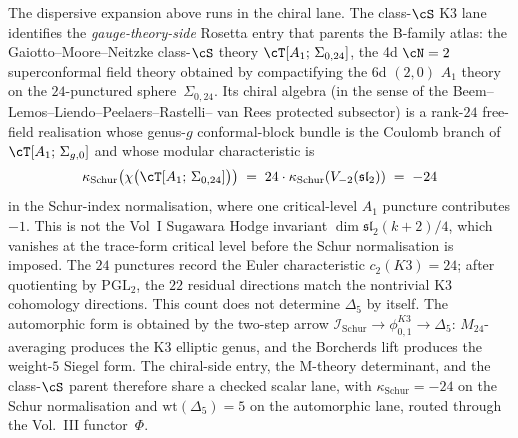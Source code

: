 \begin{remark}[class-$\cS$ $A_1$ on $\Sigma_{0,24}$ as the 4d $\cN=2$ parent]
\label{rem:rosetta-classS-sigma-0-24}
%
%
%
The dispersive expansion above runs in the chiral lane. The class-$\cS$
K3 lane
identifies the \emph{gauge-theory-side} Rosetta entry that parents
the B-family atlas: the Gaiotto--Moore--Neitzke class-$\cS$ theory
$\cT[A_1;\,\Sigma_{0,24}]$, the 4d $\cN=2$ superconformal field
theory obtained by compactifying the 6d $(2,0)$ $A_1$ theory on the
$24$-punctured sphere~$\Sigma_{0,24}$. Its chiral algebra
\textup{(}in the sense of the Beem--Lemos--Liendo--Peelaers--Rastelli--
van Rees protected subsector\textup{)} is a rank-$24$ free-field
realisation whose genus-$g$ conformal-block bundle is the Coulomb
branch of $\cT[A_1;\,\Sigma_{g,0}]$ and whose modular characteristic is
\[
\kappa_{\mathrm{Schur}}\bigl(\chi\bigl(\cT[A_1;\,\Sigma_{0,24}]\bigr)\bigr)
\;=\;
24 \cdot \kappa_{\mathrm{Schur}}(V_{-2}(\mathfrak{sl}_2))
\;=\;
-24
\]
in the Schur-index normalisation, where one critical-level \(A_1\)
puncture contributes \(-1\).
This is not the Vol~I Sugawara Hodge invariant
\(\dim\mathfrak{sl}_2(k+2)/4\), which vanishes at the trace-form
critical level before the Schur normalisation is imposed.
The $24$ punctures record the Euler
characteristic $c_2(K3)=24$; after quotienting by $\mathrm{PGL}_2$,
the $22$ residual directions match the nontrivial K3 cohomology
directions. This count does not determine $\Delta_5$ by itself. The
automorphic form is obtained by the two-step arrow
$\mathcal I_{\mathrm{Schur}}\to\phi_{0,1}^{K3}\to\Delta_5$:
$M_{24}$-averaging produces the K3 elliptic genus, and the
Borcherds lift produces the weight-$5$ Siegel form. The chiral-side
entry, the M-theory determinant, and the class-$\cS$ parent therefore
share a checked scalar lane, with \(\kappa_{\mathrm{Schur}}=-24\) on the Schur
normalisation and $\mathrm{wt}(\Delta_5)=5$ on the automorphic lane,
routed through the Vol.~III functor~$\Phi$.
\end{remark}

